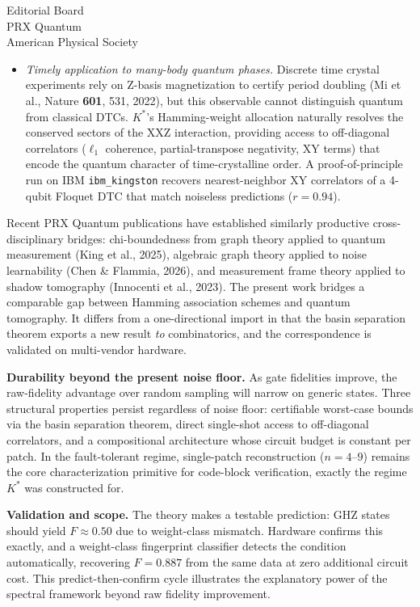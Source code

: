 \documentclass[12pt]{letter}
\newcommand{\paragraph}[1]{\medskip\noindent\textbf{#1}\enspace}
\begin{document}
\begin{letter}{Editorial Board\\
PRX Quantum\\
American Physical Society}
\begin{itemize}
\item \emph{Timely application to many-body quantum phases.}
  Discrete time crystal experiments rely on Z-basis magnetization
  to certify period doubling (Mi et al., Nature \textbf{601}, 531,
  2022), but this observable cannot distinguish quantum from
  classical DTCs.
  $K^*$'s Hamming-weight allocation naturally resolves the conserved
  sectors of the XXZ interaction, providing access to off-diagonal
  correlators ($\ell_1$ coherence, partial-transpose negativity,
  XY terms) that encode the quantum character of time-crystalline
  order.
  A proof-of-principle run on IBM \texttt{ibm\_kingston} recovers
  nearest-neighbor XY correlators of a 4-qubit Floquet DTC that
  match noiseless predictions ($r = 0.94$).
\end{itemize}

Recent PRX Quantum publications have established similarly
productive cross-disciplinary bridges: chi-boundedness from graph
theory applied to quantum measurement (King et al., 2025),
algebraic graph theory applied to noise learnability
(Chen \& Flammia, 2026), and measurement frame theory applied
to shadow tomography (Innocenti et al., 2023).
The present work bridges a comparable gap between Hamming
association schemes and quantum tomography.
It differs from a one-directional import in that the basin
separation theorem exports a new result \emph{to} combinatorics,
and the correspondence is validated on multi-vendor hardware.

\paragraph{Durability beyond the present noise floor.}
As gate fidelities improve, the raw-fidelity advantage over random
sampling will narrow on generic states.
Three structural properties persist regardless of noise floor:
certifiable worst-case bounds via the basin separation theorem,
direct single-shot access to off-diagonal correlators, and a
compositional architecture whose circuit budget is constant per
patch.
In the fault-tolerant regime, single-patch reconstruction
($n = 4$--$9$) remains the core characterization primitive for
code-block verification, exactly the regime $K^*$ was
constructed for.

\paragraph{Validation and scope.}
The theory makes a testable prediction: GHZ states should yield
$F \approx 0.50$ due to weight-class mismatch.
Hardware confirms this exactly, and a weight-class fingerprint
classifier detects the condition automatically, recovering
$F = 0.887$ from the same data at zero additional circuit cost.
This predict-then-confirm cycle illustrates the explanatory
power of the spectral framework beyond raw fidelity improvement.


\end{letter}
\end{document}
